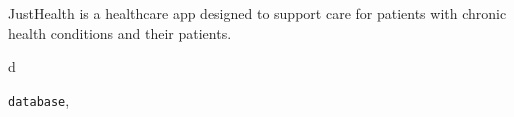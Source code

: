 \documentclass[letterpaper,10pt,english]{sphinxmanual}
\begin{document}
JustHealth is a healthcare app designed to support care for patients with chronic health conditions and their patients.


\renewcommand{\indexname}{Python Module Index}
\begin{theindex}
\def\bigletter#1{{\Large\sffamily#1}\nopagebreak\vspace{1mm}}
\bigletter{d}
\item {\texttt{database}}, \pageref{docs/users:module-database}
\end{theindex}

\renewcommand{\indexname}{Index}
\printindex
\end{document}
